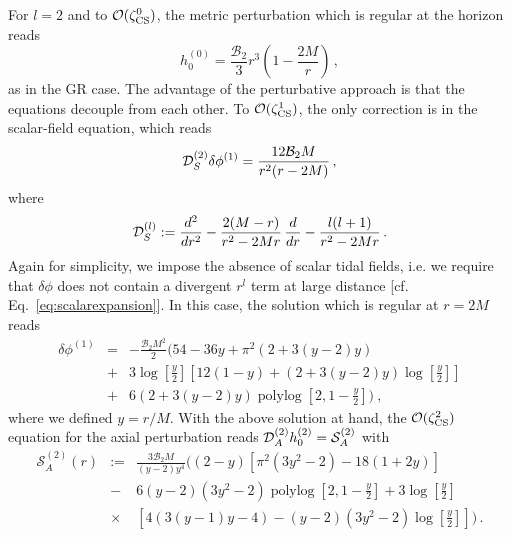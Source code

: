 \documentclass[aps,twocolumn,showpacs,preprintnumbers,nofootinbib,prd,superscriptaddress,groupedaddress,10pt]{revtex4-1}
\def\nn{\nonumber}
\def\polylog{\operatorname{polylog}}
\def\be{\begin{equation}}
\def\ee{\end{equation}}
\begin{document}
For $l=2$ and to ${\cal O}(\zeta_{\rm CS}^0)$, the metric perturbation which is regular at the horizon reads
%
\be
h_0^{(0)}=\frac{\mathcal{B}_2}{3}r^3\left(1-\frac{2M}{r}\right)\,,
\ee
as in the GR case.
The advantage of the perturbative approach is that the equations decouple from each other. 
To ${\cal O}(\zeta_{\rm CS}^1)$, the only correction is in the scalar-field equation, which reads
%
\begin{equation}
 {\cal D}_S^{(2)}\delta\phi^{(1)} = \frac{12\mathcal{B}_2 M}{r^2(r-2M)}\,,
\end{equation}
%
where
\begin{equation}
{\cal D}_S^{(l)}:= \frac{d^2}{dr^2}-\frac{2(M-r)}{r^2-2Mr}\,\frac{d}{dr}-\frac{l(l+1)}{r^2-2Mr}\,.
\end{equation}
%
Again for simplicity, we impose the absence of scalar tidal fields, i.e. we require that $\delta\phi$ does not contain a divergent $r^l$ term at large distance [cf. Eq.~\eqref{eq:scalarexpansion}]. In this case, the solution which is regular at $r=2M$ reads
%
\begin{eqnarray}
\delta\phi^{(1)} &=& -\frac{\mathcal{B}_2 M^2}{2} \biggl(
54-36y+\pi ^2 \left(2+3 (y-2) y\right) \nn\\
%
&+&3\log\left[\frac{y}{2}\right] \left[12 (1-y)+(2+3 (y-2) y)\log\left[\frac{y}{2}\right]\right]\nn\\
%
&+&6(2+3 (y-2)y) \polylog\left[2,1-\frac{y}{2}\right] \biggr)\ ,
\end{eqnarray}
%
where we defined $y=r/M$.
%
With the above solution at hand, the ${\cal O}(\zeta_{\rm CS}^2)$ equation for the axial perturbation reads ${\cal D}_{A}^{(2)}{h_0^{(2)}} = \mathcal{S}_A^{(2)}$ with
%
\begin{eqnarray}
\mathcal{S}_A^{(2)}(r)&:=& \frac{3\mathcal{B}_2 M}{(y-2) y^4} \biggl((2-y) 
\left[\pi ^2 \left(3 y^2-2\right)-18 (1+2 y)\right]\nn\\
%
&-&6 (y-2) \left(3 y^2-2\right)  \polylog\left[2,1-\frac{y}{2}\right]+3 \log\left[\frac{y}{2}\right] \nn\\
%
&\times&\left[4 (3 (y-1) y-4)-(y-2) \left(3 y^2-2\right) \log\left[\frac{y}{2}\right]\right]\biggr) \,. \nn\\\label{DCSscalar}
\end{eqnarray}
%
\end{document}
